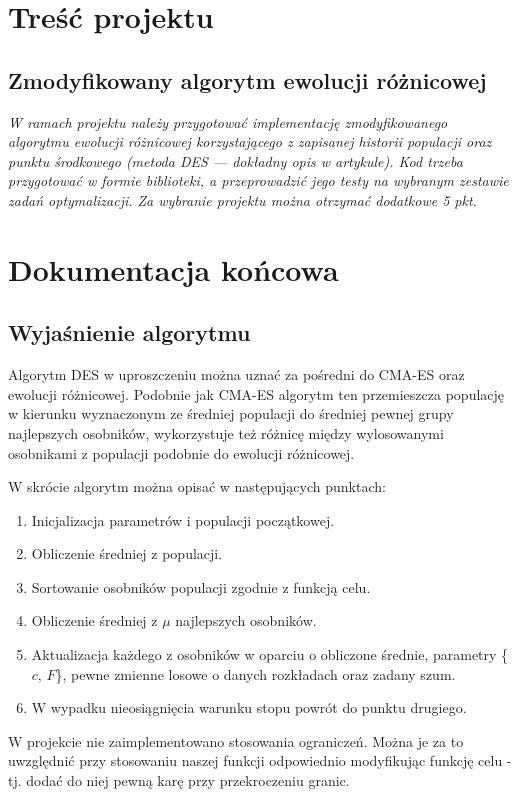 \chapter{Treść projektu}
\section{Zmodyfikowany algorytm ewolucji różnicowej}
\textit{W ramach projektu należy przygotować implementację zmodyfikowanego algorytmu ewolucji różnicowej korzystającego z zapisanej historii populacji oraz punktu środkowego (metoda DES --- dokładny opis w artykule). Kod trzeba przygotować w formie biblioteki, a przeprowadzić jego testy na wybranym zestawie zadań optymalizacji. Za wybranie projektu można otrzymać dodatkowe 5 pkt.}

\chapter{Dokumentacja końcowa}
\section{Wyjaśnienie algorytmu}
Algorytm DES w uproszczeniu można uznać za pośredni do CMA-ES oraz ewolucji różnicowej. Podobnie jak CMA-ES algorytm ten przemieszcza populację w kierunku wyznaczonym ze średniej populacji do średniej pewnej grupy najlepszych osobników, wykorzystuje też różnicę między wylosowanymi osobnikami z populacji podobnie do ewolucji różnicowej.

W skrócie algorytm można opisać w następujących punktach:

\begin{enumerate}
    \item Inicjalizacja parametrów i populacji początkowej.
    \item Obliczenie średniej z populacji.
    \item Sortowanie osobników populacji zgodnie z funkcją celu.
    \item Obliczenie średniej z $\mu$ najlepszych osobników.
    \item Aktualizacja każdego z osobników w oparciu o obliczone średnie, parametry \{$c$, $F$\}, pewne zmienne losowe o danych rozkładach oraz zadany szum.
    \item W wypadku nieosiągnięcia warunku stopu powrót do punktu drugiego.
\end{enumerate}

W projekcie nie zaimplementowano stosowania ograniczeń. Można je za to uwzględnić przy stosowaniu naszej funkcji odpowiednio modyfikując funkcję celu - tj. dodać do niej pewną karę przy przekroczeniu granic.

